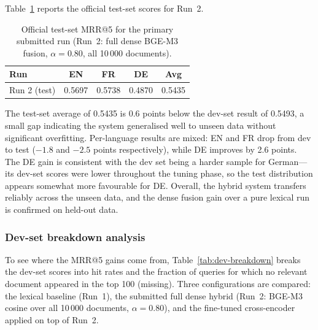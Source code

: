 Table~\ref{tab:test-results} reports the official test-set scores for Run~2.

\begin{table}[!ht]
    \caption{Official test-set MRR@5 for the primary submitted run (Run~2: full dense BGE-M3 fusion, $\alpha{=}0.80$, all 10\,000 documents).}
    \label{tab:test-results}
    \centering
    \begin{tabular}{lcccc}
        \toprule
        Run & EN & FR & DE & Avg \\
        \midrule
        Run 2 (test) & 0.5697 & 0.5738 & 0.4870 & 0.5435 \\
        \bottomrule
    \end{tabular}
\end{table}

The test-set average of 0.5435 is 0.6 points below the dev-set result of 0.5493, a small gap indicating the system generalised well to unseen data without significant overfitting. Per-language results are mixed: EN and FR drop from dev to test ($-1.8$ and $-2.5$ points respectively), while DE improves by 2.6 points. The DE gain is consistent with the dev set being a harder sample for German---its dev-set scores were lower throughout the tuning phase, so the test distribution appears somewhat more favourable for DE\@. Overall, the hybrid system transfers reliably across the unseen data, and the dense fusion gain over a pure lexical run is confirmed on held-out data.

\subsubsection*{Dev-set breakdown analysis}

To see where the MRR@5 gains come from, Table~\ref{tab:dev-breakdown} breaks the dev-set scores into hit rates and the fraction of queries for which no relevant document appeared in the top 100 (missing). Three configurations are compared: the lexical baseline (Run~1), the submitted full dense hybrid (Run~2: BGE-M3 cosine over all 10\,000 documents, $\alpha{=}0.80$), and the fine-tuned cross-encoder applied on top of Run~2.

